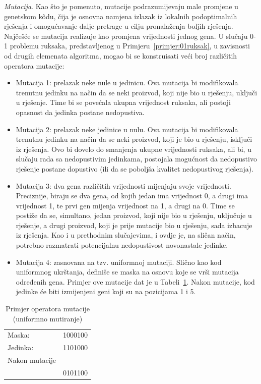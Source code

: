 \documentclass[a4paper, utf8, 11pt, colorlinks]{book}
\theoremstyle{definition}
\begin{document}
\emph{Mutacija}. Kao što je pomenuto, mutacije podrazumijevaju male promjene u genetskom k\^odu, čija je osnovna namjena izlazak iz lokalnih podoptimalnih rješenja i omogućavanje dalje pretrage u cilju pronalaženja boljih rješenja. Najčešće se mutacija realizuje kao promjena vrijednosti jednog gena. U slučaju  0-1 problemu ruksaka, predstavljenog u Primjeru~\ref{primjer:01ruksak}, u zavisnosti od drugih elemenata algoritma, mogao bi se konstruisati veći broj različitih operatora mutacije: 
\begin{itemize}
	\item Mutacija 1: prelazak neke nule u jedinicu. Ova mutacija bi modifikovala trenutnu jedinku na način da se neki proizvod, koji nije bio u rješenju, uključi u rješenje. Time bi se povećala ukupna vrijednost ruksaka, ali postoji opasnost da jedinka postane nedopustiva.
	\item  Mutacija 2: prelazak neke jedinice u nulu. Ova mutacija bi modifikovala trenutnu jedinku na način da se neki proizvod, koji je bio u rješenju, isključi iz rješenja. Ovo bi dovelo do smanjenja ukupne vrijednosti ruksaka, ali bi, u slučaju rada sa nedopustivim jedinkama, postojala mogućnost da nedopustivo rješenje postane dopustivo (ili da se poboljša kvalitet nedopustivog rješenja).
	\item  Mutacija 3: dva gena različitih vrijednosti mijenjaju svoje vrijednosti. Preciznije, biraju se dva gena, od kojih jedan ima vrijednost 0, a drugi ima vrijednost 1, te prvi gen mijenja vrijednost na 1, a drugi na 0. Time se postiže da se, simultano, jedan proizvod, koji nije bio u rješenju, uključuje u rješenje, a drugi proizvod, koji je prije mutacije bio u rješenju, sada izbacuje iz rješenja. Kao i u prethodnim slučajevima, i ovdje je, na sličan način, potrebno razmatrati potencijalnu nedopustivost novonastale jedinke.
	\item Mutacija 4: zasnovana na tzv. uniformnoj mutaciji. Slično kao kod uniformnog ukrštanja, definiše se maska na osnovu koje se vrši mutacija određenih gena. Primjer ove mutacije dat je u Tabeli~\ref{tbl:unimut}. Nakon mutacije, kod jedinke će biti izmijenjeni geni koji su na pozicijama 1 i 5.
\end{itemize}



\begin{table}[H]
	\centering
	\begin{tabular}{lc}
		Maska:  &  1000100  \\
		Jedinka: & 1101000  \\ \hline
		Nakon mutacije &       \\
		               & 0101100      \\
	\end{tabular}	
	\caption{Primjer operatora mutacije (uniformno mutiranje)}\label{tbl:unimut}
\end{table}
\end{document}
